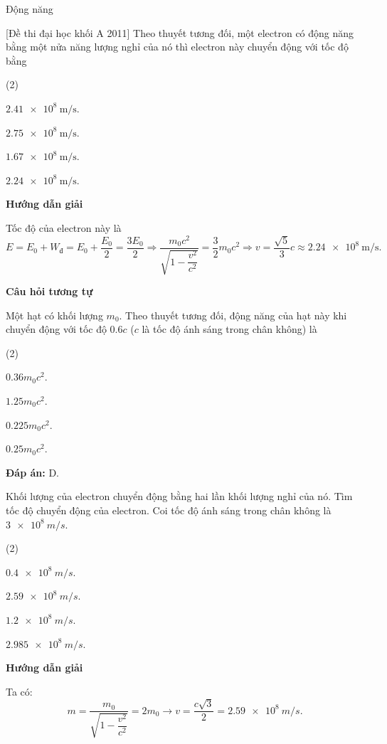 \begin{dang}{Động năng}
	
	{[Đề thi đại học khối A 2011] Theo thuyết tương đối, một electron có động năng bằng một nửa năng lượng nghỉ của nó thì electron này chuyển động với tốc độ bằng 
		\begin{mcq}(2)
			\item $\SI{2,41e8}{\meter/\second}$.
			\item $\SI{2,75e8}{\meter/\second}$. 
			\item $\SI{1,67e8}{\meter/\second}$. 
			\item $\SI{2,24e8}{\meter/\second}$. 
	\end{mcq}}
	{\begin{center}
			\textbf{Hướng dẫn giải}
		\end{center}
		Tốc độ của electron này là
		\begin{equation*}
			E=E_0+W_\text{đ}=E_0+\dfrac{E_0}{2}=\dfrac{3E_0}{2}\Rightarrow \dfrac{m_0c^2}{\sqrt{1-\dfrac{v^2}{c^2}}} = \dfrac{3}{2}m_0c^2\Rightarrow v=\dfrac{\sqrt{5}}{3}c\approx\SI{2,24e8}{\meter/\second}.
		\end{equation*}
		
		\begin{center}
			\textbf{Câu hỏi tương tự}
		\end{center}
		
		Một hạt có khối lượng $ m_{0} $. Theo thuyết tương đối, động năng của hạt này khi chuyển động với tốc độ $ \num{0,6}c $ ($ c $ là tốc độ ánh sáng trong chân không) là
		\begin{mcq}(2)
			\item $ \num{0,36} m_{0}c^{2} $.
			\item $ \num{1,25} m_{0}c^{2} $.
			\item $ \num{0,225} m_{0}c^{2} $.
			\item $ \num{0,25} m_{0}c^{2} $.
		\end{mcq}
		
		\textbf{Đáp án:} D.
	}
	
	{
		Khối lượng của electron chuyển động bằng hai lần khối lượng nghỉ của nó. Tìm tốc độ chuyển động của electron. Coi tốc độ ánh sáng trong chân không là $ \SI{3 e8}{m/s} $.
		\begin{mcq}(2)
			\item $ \SI{0,4 e8}{m/s} $.
			\item $ \SI{2,59 e8}{m/s} $.
			\item $ \SI{1,2 e8}{m/s} $.
			\item $ \SI{2,985 e8}{m/s} $.
		\end{mcq}
	}
	{
		\begin{center}
			\textbf{Hướng dẫn giải}
		\end{center}
		Ta có:
		$$
		m = \dfrac{m_{0}}{\sqrt{1-\dfrac{v^{2}}{c^{2}}}} = 2m_{0} \rightarrow v = \dfrac{c\sqrt{3}}{2} = \SI{2,59 e8}{m/s}.
		$$
		
}
\end{dang}
